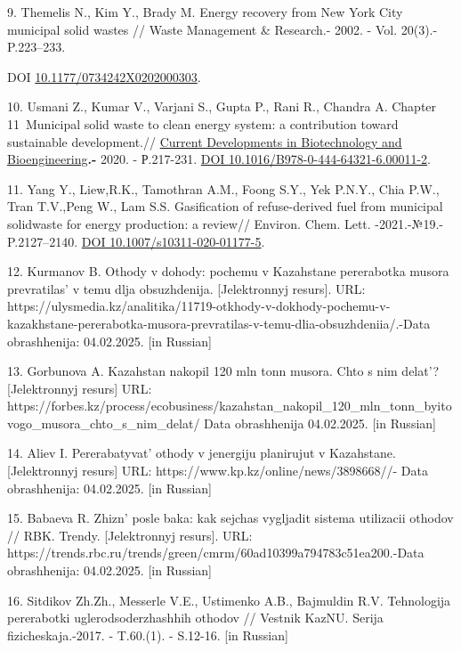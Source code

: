 \begin{references}
9. Themelis N., Kim Y., Brady M. Energy recovery from New York City
municipal solid wastes // Waste Management \& Research.- 2002. - Vol.
20(3).- P.223--233.

DOI
\href{http://dx.doi.org/10.1177/0734242X0202000303}{10.1177/0734242X0202000303}.

10. Usmani Z., Kumar V., Varjani S., Gupta P., Rani R., Chandra A.
Chapter 11~Municipal solid waste to clean energy system: a
contribution toward sustainable development.//
\href{https://www.sciencedirect.com/book/9780444643216/current-developments-in-biotechnology-and-bioengineering}{Current
Developments in Biotechnology and Bioengineering}{\bfseries .-} 2020. -
Р.217-231. \href{https://doi.org/10.1016/B978-0-444-64321-6.00011-2}{DOI
10.1016/B978-0-444-64321-6.00011-2}.

11. Yang Y., Liew,R.K., Tamothran A.M., Foong S.Y., Yek P.N.Y., Chia
P.W., Tran T.V.,Peng W., Lam S.S. Gasification of refuse-derived fuel
from municipal solidwaste for energy production: a review// Environ.
Chem. Lett. -2021.-№19.- P.2127--2140.
\href{https://doi.org/10.1007/s10311-020-01177-5}{DOI
10.1007/s10311-020-01177-5}.

12. Kurmanov B. Othody v dohody: pochemu v Kazahstane pererabotka musora
prevratilas'{} v temu dlja obsuzhdenija. {[}Jelektronnyj
resurs{]}. URL:
https://ulysmedia.kz/analitika/11719-otkhody-v-dokhody-pochemu-v-kazakhstane-pererabotka-musora-prevratilas-v-temu-dlia-obsuzhdeniia/.-Data
obrashhenija: 04.02.2025. {[}in Russian{]}

13. Gorbunova A. Kazahstan nakopil 120 mln tonn musora. Chto s nim
delat'? {[}Jelektronnyj resurs{]} URL:
https://forbes.kz/process/ecobusiness/kazahstan\_nakopil\_120\_mln\_tonn\_byitovogo\_musora\_chto\_s\_nim\_delat/
Data obrashhenija 04.02.2025. {[}in Russian{]}

14. Aliev I. Pererabatyvat'{} othody v jenergiju
planirujut v Kazahstane. {[}Jelektronnyj resurs{]} URL:
https://www.kp.kz/online/news/3898668//- Data obrashhenija: 04.02.2025.
{[}in Russian{]}

15. Babaeva R. Zhizn'{} posle baka: kak sejchas vygljadit
sistema utilizacii othodov // RBK. Trendy. {[}Jelektronnyj resurs{]}.
URL:
https://trends.rbc.ru/trends/green/cmrm/60ad10399a794783c51ea200.-Data
obrashhenija: 04.02.2025. {[}in Russian{]}

16. Sitdikov Zh.Zh., Messerle V.E., Ustimenko A.B., Bajmuldin R.V.
Tehnologija pererabotki uglerodsoderzhashhih othodov // Vestnik KazNU.
Serija fizicheskaja.-2017. - T.60.(1). - S.12-16. {[}in Russian{]}


\end{references}
